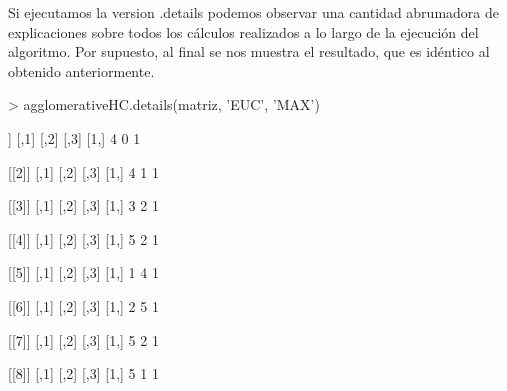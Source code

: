 \documentclass[a4paper]{article}
\begin{document}
\newpage

Si ejecutamos la version .details podemos observar una cantidad abrumadora de explicaciones sobre todos los cálculos realizados a lo largo de la ejecución del algoritmo. Por supuesto, al final se nos muestra el resultado, que es idéntico al obtenido anteriormente.

\begin{Schunk}
\begin{Sinput}
> agglomerativeHC.details(matriz, 'EUC', 'MAX')
\end{Sinput}
\begin{Soutput}
[[1]]
     [,1] [,2] [,3]
[1,]    4    0    1

[[2]]
     [,1] [,2] [,3]
[1,]    4    1    1

[[3]]
     [,1] [,2] [,3]
[1,]    3    2    1

[[4]]
     [,1] [,2] [,3]
[1,]    5    2    1

[[5]]
     [,1] [,2] [,3]
[1,]    1    4    1

[[6]]
     [,1] [,2] [,3]
[1,]    2    5    1

[[7]]
     [,1] [,2] [,3]
[1,]    5    2    1

[[8]]
     [,1] [,2] [,3]
[1,]    5    1    1


\end{Soutput}
\end{Schunk}
\end{document}
